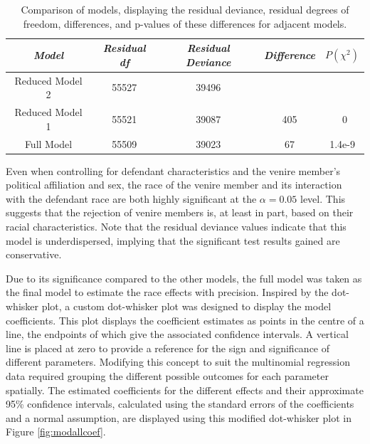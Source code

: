 \documentclass[12pt]{article}
\begin{document}
\begin{table}[h!]
  \centering
  \caption[Nested ANOVA Table Demonstrating the Importance of
  Race]{\footnotesize Comparison of models, displaying the residual deviance, residual degrees of freedom, differences, and p-values of these
    differences for adjacent models.}
  \label{tab:modcomp}
  \begin{tabular}{|c|c|c|c|c|} \hline
    \textit{Model} & \textit{Residual df} & \textit{Residual Deviance} & \textit{Difference} & $P(\chi^2)$ \\ \hline
    Reduced Model 2 & 55527 & 39496 &  &  \\
    Reduced Model 1 & 55521 & 39087 & 405 & ~0 \\
    Full Model & 55509 & 39023 & 67 & 1.4e-9 \\ \hline
  \end{tabular}
\end{table}

Even when controlling for defendant characteristics and the venire member's political affiliation and sex, the race of the venire member and its interaction with the defendant race are both highly significant at the $\alpha = 0.05$ level. This suggests that the rejection of venire members is, at least in part, based on their racial characteristics. Note that the residual deviance values indicate that this model is underdispersed, implying that the significant test results gained are conservative.

Due to its significance compared to the other models, the full model was taken as the final model to estimate the race effects with precision. Inspired by the dot-whisker plot, a custom dot-whisker plot was designed to display the model coefficients. This plot displays the coefficient estimates as points in the centre of a line, the endpoints of which give the associated confidence intervals. A vertical line is placed at zero to provide a reference for the sign and significance of different parameters. Modifying this concept to suit the multinomial regression data required grouping the different possible outcomes for each parameter spatially. The estimated coefficients for the different effects and their approximate 95\% confidence intervals, calculated using the standard errors of the coefficients and a normal assumption, are displayed using this modified dot-whisker plot in Figure \ref{fig:modallcoef}.
\end{document}
